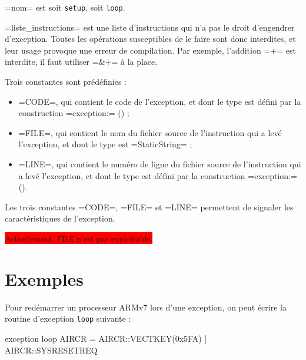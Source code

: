 \plm=nom= est soit \texttt{setup}, soit \texttt{loop}.

\plm=liste_instructions= est une liste d'instructions qui n'a pas le droit d'engendrer d'exception. Toutes les opérations susceptibles de le faire sont donc interdites, et leur usage provoque une erreur de compilation. Par exemple, l'addition \plm=+= est interdite, il faut utiliser \plm=&+= à la place.

Trois constantes sont prédéfinies :
\begin{itemize}
  \item \plm=CODE=, qui contient le code de l'exception, et dont le type est défini par la construction \plm=exception:= () ;
  \item \plm=FILE=, qui contient le nom du fichier source de l'instruction qui a levé l'exception, et dont le type est \plm=StaticString= ;
  \item \plm=LINE=, qui contient le numéro de ligne du fichier source de l'instruction qui a levé l'exception, et dont le type est défini par la construction \plm=exception:= ().
\end{itemize}

Les trois constantes \plm=CODE=, \plm=FILE= et \plm=LINE= permettent de signaler les caractéristiques de l'exception.

\colorbox{red}{Actuellement, \texttt{FILE} n'est pas exploitable.}

\section{Exemples}

Pour redémarrer un processeur ARMv7 lors d'une exception, on peut écrire la routine d'exception \texttt{loop} suivante :
\begin{PLM}
exception loop {
  AIRCR = AIRCR::VECTKEY(0x5FA) | AIRCR::SYSRESETREQ
}
\end{PLM}
